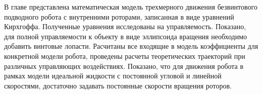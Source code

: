 В главе представлена математическая модель трехмерного движения безвинтового подводного робота с внутренними роторами, записанная в виде уравнений Кирхгоффа. Полученные уравнения исследованы на управляемость. Показано, для полной управляемости к объекту в виде эллипсоида вращения необходимо добавить винтовые лопасти. Расчитаны все входящие в модель коэффициенты для конкретной модели робота, проведены расчеты теоретических траекторий при различных управляющих воздействиях. Показано, что для движения робота в рамках модели идеальной жидкости с постоянной угловой и линейной скоростями, достаточно задавать постоянные скорости вращения роторов.
%
%
%	
%	

